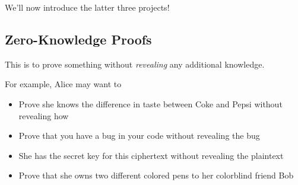 We'll now introduce the latter three projects!

\subsection{Zero-Knowledge Proofs}
This is to prove something without \emph{revealing} any additional knowledge.

For example, Alice may want to
\begin{itemize}
    \item Prove she knows the difference in taste between Coke and Pepsi without revealing how
    \item Prove that you have a bug in your code without revealing the bug
    \item She has the secret key for this ciphertext without revealing the plaintext
    \item Prove that she owns two different colored pens to her colorblind friend Bob
\end{itemize}

